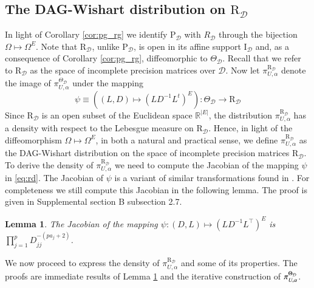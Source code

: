 \documentclass[12pt]{article}
\newcommand{\R}{\mathbb{R}}
\newcommand{\D}{\mathcal{D}}
\newcommand{\Rd}{\mathrm{R}_{\D}}
\theoremstyle{plain}
\newtheorem{lemma}[theorem]{Lemma}
\theoremstyle{definition}
\theoremstyle{remark}
\begin{document}
 
 
  \subsection{The DAG-Wishart distribution on $\Rd$}\label{sub:Rd}
 In light of Corollary \ref{cor:pg_rg} we identify $\mathrm{P}_{\D}$ with $R_{\D}$  through the bijection $\Omega\mapsto \Omega^{E}$. Note that $\Rd$, unlike $\mathrm{P}_{\D}$, is open in its affine support $\mathrm{I}_{\D}$ and, as a consequence of Corollary \ref{cor:pg_rg}, diffeomorphic to $\Theta_{\D}$. Recall that we refer to $\mathrm{R}_{\D}$ as the space of incomplete precision matrices over $\D$. Now let $\pi_{U,\alpha}^{\mathrm{R}_{\D}}$ denote the image  of  $\pi^{{\Theta}_{\D}}_{U,\alpha}$ under the mapping
\begin{equation}\label{eq:rd}
 \psi\equiv \left(\left(L,D\right)\mapsto\left(LD^{-1}L^{t}\right)^{E}\right):\Theta_{\D}\rightarrow\mathrm{R}_{\D}
\end{equation}
 \noindent Since  $\mathrm{R}_{\D}$  is  an open subset of the Euclidean space  $\R^{|E|}$, the distribution $\pi_{U,\alpha}^{\mathrm{R}_{\D}}$ has a density with respect to  the Lebesgue measure on $\mathrm{R}_{\D}$. Hence, in light of the diffeomorphism $\Omega\mapsto \Omega^{E}$, in both a natural and practical sense, we define $\pi_{U,\alpha}^{\mathrm{R}_{\D}}$ as the DAG-Wishart distribution on the space of incomplete precision matrices $\mathrm{R}_{\D}$. To derive the density of $\pi_{U,\alpha}^{\mathrm{R}_{\D}}$ we need to compute the Jacobian of the mapping $\psi$ in \eqref{eq:rd}. The  Jacobian  of $\psi$ is a variant of similar transformations found in \cite{roverato00*, khare09a*}. For completeness we still compute this Jacobian  in the following lemma. The proof is given in Supplemental section B subsection 2.7. 
 \begin{lemma}\cite{roverato00*, khare09a*} \label{lem:jacobian_of_psi}
 The Jacobian of the mapping $\psi:(D, L)\mapsto\left( LD^{-1}L^{\top}\right)^{E}$ is $\prod_{j=1}^{p} D_{jj} ^{-(pa_j+2)}$.
 \end{lemma}
 We now proceed to express the density of $\pi_{U,\alpha}^{\mathrm{R}_{\D}}$ and some of its properties. The  proofs are immediate results of Lemma \ref{lem:jacobian_of_psi} and the iterative construction of $\pi^{\Theta_{\cal D}}_{U,\alpha}$. 
\end{document}
